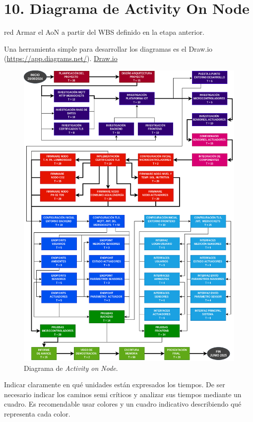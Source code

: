 \documentclass[
11pt, %
codirector, %
]{charter}
\begin{document}
\section{10. Diagrama de Activity On Node}
\label{sec:AoN}

\begin{consigna}{red}
	Armar el AoN a partir del WBS definido en la etapa anterior.

	Una herramienta simple para desarrollar los diagramas es el Draw.io
	(\url{https://app.diagrams.net/}). \href{https://app.diagrams.net}{Draw.io}

	\begin{figure}[htpb]
		\centering
		\includegraphics[width=.8\textwidth]{./Figuras/AoN.png}
		\caption{Diagrama de \textit{Activity on Node}.}
		\label{fig:AoN}
	\end{figure}

	Indicar claramente en qué unidades están expresados los tiempos. De ser
	necesario indicar los caminos semi críticos y analizar sus tiempos mediante un
	cuadro. Es recomendable usar colores y un cuadro indicativo describiendo qué
	representa cada color.

\end{consigna}
\end{document}
